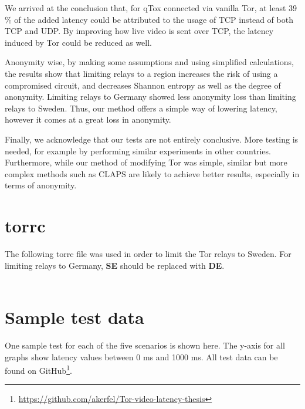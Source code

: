 \documentclass{kththesis}
\begin{document}
We arrived at the conclusion that, for qTox connected via vanilla Tor, at least 39 \% of the added latency could be attributed to the usage of TCP instead of both TCP and UDP. By improving how live video is sent over TCP, the latency induced by Tor could be reduced as well.

Anonymity wise, by making some assumptions and using simplified calculations, the results show that limiting relays to a region increases the risk of using a compromised circuit, and decreases Shannon entropy as well as the degree of anonymity. Limiting relays to Germany showed less anonymity loss than limiting relays to Sweden. Thus, our method offers a simple way of lowering latency, however it comes at a great loss in anonymity.

Finally, we acknowledge that our tests are not entirely conclusive. More testing is needed, for example by performing similar experiments in other countries. Furthermore, while our method of modifying Tor was simple, similar but more complex methods such as CLAPS \parencite{CLAPS} are likely to achieve better results, especially in terms of anonymity.

\printbibliography[heading=bibintoc]

\appendix
\chapter{torrc}
\label{section:torrcAppendix}
The following torrc file was used in order to limit the Tor relays to Sweden. For limiting relays to Germany, \textbf{SE} should be replaced with \textbf{DE}.
\\
\\
\noindent{}

\chapter{Sample test data}
\label{section:sampleTestData}
One sample test for each of the five scenarios is shown here. The y-axis for all graphs show latency values between 0 ms and 1000 ms. All test data can be found on GitHub\footnote{\url{https://github.com/akerfel/Tor-video-latency-thesis}}.
\end{document}
